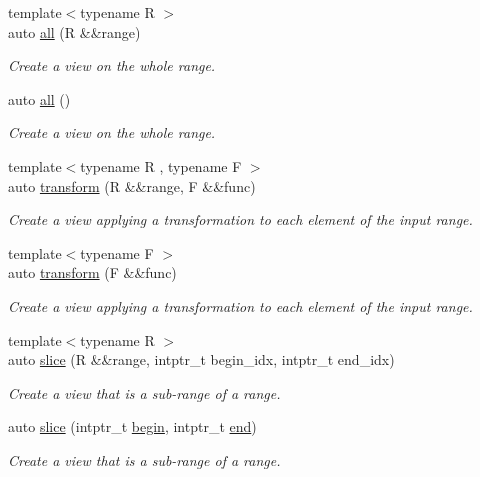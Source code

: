 \begin{DoxyCompactItemize}
{\footnotesize template$<$typename R $>$ }\\auto \mbox{\hyperlink{namespacerah_1_1view_acc7f1420accc862d2ac433ba9c697e95}{all}} (R \&\&range)
\begin{DoxyCompactList}\small\item\em Create a view on the whole range. \end{DoxyCompactList}\item 
auto \mbox{\hyperlink{namespacerah_1_1view_aeed660f7f6a4e0fbefffa4e42de7642a}{all}} ()
\begin{DoxyCompactList}\small\item\em Create a view on the whole range. \end{DoxyCompactList}\item 
{\footnotesize template$<$typename R , typename F $>$ }\\auto \mbox{\hyperlink{namespacerah_1_1view_ad8750f5c95edcf4f26b0a1c1eec3d676}{transform}} (R \&\&range, F \&\&func)
\begin{DoxyCompactList}\small\item\em Create a view applying a transformation to each element of the input range. \end{DoxyCompactList}\item 
{\footnotesize template$<$typename F $>$ }\\auto \mbox{\hyperlink{namespacerah_1_1view_a7c981c90e5ad03eca3ec738176feaf7d}{transform}} (F \&\&func)
\begin{DoxyCompactList}\small\item\em Create a view applying a transformation to each element of the input range. \end{DoxyCompactList}\item 
{\footnotesize template$<$typename R $>$ }\\auto \mbox{\hyperlink{namespacerah_1_1view_a419374b95b3b9601655b0edf753963c3}{slice}} (R \&\&range, intptr\+\_\+t begin\+\_\+idx, intptr\+\_\+t end\+\_\+idx)
\begin{DoxyCompactList}\small\item\em Create a view that is a sub-\/range of a range. \end{DoxyCompactList}\item 
auto \mbox{\hyperlink{namespacerah_1_1view_af2baef5b0078f0768cbfee4aae4e9924}{slice}} (intptr\+\_\+t \mbox{\hyperlink{namespacerah_a2c4a19e57cc4e0753e93830f247def6d}{begin}}, intptr\+\_\+t \mbox{\hyperlink{namespacerah_aaddd1442cd76b96876e692cdefe7261d}{end}})
\begin{DoxyCompactList}\small\item\em Create a view that is a sub-\/range of a range. \end{DoxyCompactList}\item 

\end{DoxyCompactItemize}
